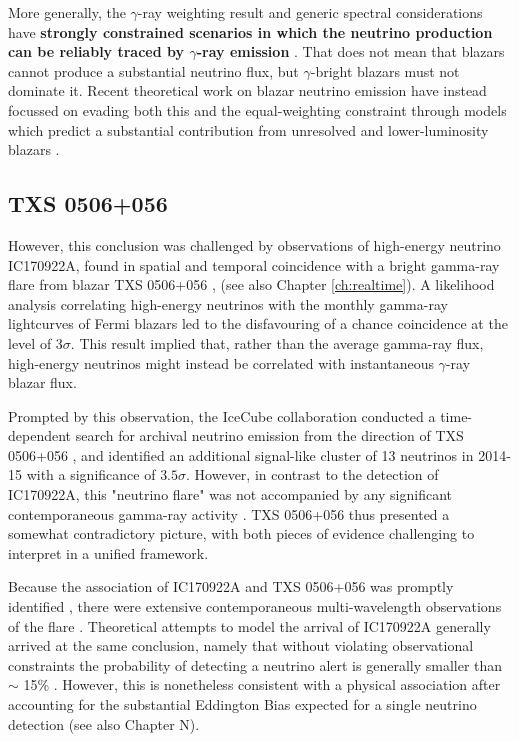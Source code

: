  More generally, the $\gamma$-ray weighting result and generic spectral considerations have \textbf{strongly constrained scenarios in which the neutrino production can be reliably traced by $\gamma$-ray emission} . That does not mean that blazars cannot produce a substantial neutrino flux, but $\gamma$-bright blazars must not dominate it. Recent theoretical work on blazar neutrino emission have instead focussed on evading both this and the equal-weighting constraint through models which predict a substantial contribution from unresolved and lower-luminosity blazars .
 
 \subsection{TXS 0506+056}
 
 However, this conclusion was challenged by observations of high-energy neutrino IC170922A, found in spatial and temporal coincidence with a bright gamma-ray flare from blazar TXS 0506+056 , (see also Chapter \ref{ch:realtime}). A likelihood analysis correlating high-energy neutrinos with the monthly gamma-ray lightcurves of Fermi blazars led to the disfavouring of a chance coincidence at the level of $3 \sigma$. This result implied that, rather than the average gamma-ray flux, high-energy neutrinos might instead be correlated with instantaneous $\gamma$-ray blazar flux. 
 
 Prompted by this observation, the IceCube collaboration conducted a time-dependent search for archival neutrino emission from the direction of TXS 0506+056 , and identified an additional signal-like cluster of 13 neutrinos in 2014-15 with a significance of $3.5 \sigma$. However, in contrast to the detection of IC170922A, this "neutrino flare" was not accompanied by any significant contemporaneous gamma-ray activity . TXS 0506+056 thus presented a somewhat contradictory picture, with both pieces of evidence challenging to interpret in a unified framework. 
 
Because the association of IC170922A and TXS 0506+056 was promptly identified , there were extensive contemporaneous multi-wavelength observations of the flare \cite{2018Sci...361.1378I}. Theoretical attempts to model the arrival of IC170922A generally arrived at the same conclusion, namely that without violating observational constraints the probability of detecting a neutrino alert is generally smaller than $\sim$ 15\% . However, this is nonetheless consistent with a physical association after accounting for the substantial Eddington Bias expected for a single neutrino detection  (see also Chapter N).
 
